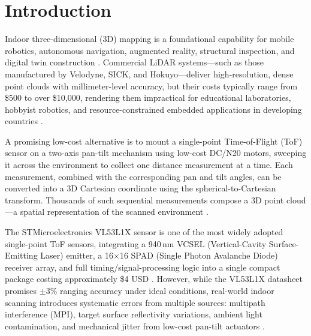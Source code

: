 \documentclass[12pt,a4paper]{article}
\begin{document}

    \setcounter{page}{1}

    \tableofcontents
    \newpage



    \section{Introduction}

    Indoor three-dimensional (3D) mapping is a foundational capability for mobile robotics, autonomous navigation, augmented reality, structural inspection, and digital twin construction \cite{hess2016real, rusu20113d}. Commercial LiDAR systems---such as those manufactured by Velodyne, SICK, and Hokuyo---deliver high-resolution, dense point clouds with millimeter-level accuracy, but their costs typically range from \$500 to over \$10,000, rendering them impractical for educational laboratories, hobbyist robotics, and resource-constrained embedded applications in developing countries \cite{amann2001laser, behroozpour2017lidar}.

    A promising low-cost alternative is to mount a single-point Time-of-Flight (ToF) sensor on a two-axis pan-tilt mechanism using low-cost DC/N20 motors, sweeping it across the environment to collect one distance measurement at a time. Each measurement, combined with the corresponding pan and tilt angles, can be converted into a 3D Cartesian coordinate using the spherical-to-Cartesian transform. Thousands of such sequential measurements compose a 3D point cloud---a spatial representation of the scanned environment \cite{willis2009design, jimenez20143d}.

    The STMicroelectronics VL53L1X sensor is one of the most widely adopted single-point ToF sensors, integrating a 940\,nm VCSEL (Vertical-Cavity Surface-Emitting Laser) emitter, a 16$\times$16 SPAD (Single Photon Avalanche Diode) receiver array, and full timing/signal-processing logic into a single compact package costing approximately \$4 USD \cite{stmicro2018vl53l1x}. However, while the VL53L1X datasheet promises $\pm$3\% ranging accuracy under ideal conditions, real-world indoor scanning introduces systematic errors from multiple sources: multipath interference (MPI), target surface reflectivity variations, ambient light contamination, and mechanical jitter from low-cost pan-tilt actuators \cite{foix2011lock, hansard2012time, corti2016metrological}.
\end{document}
